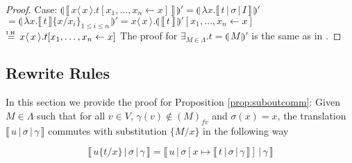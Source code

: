 \documentclass[a4paper,UKenglish,cleveref, autoref]{lipics-v2019}
\newcommand{\fv}[1]{(#1)_{fv}}
\newcommand{\abs}[2]{\lambda #1 . #2}
\newcommand{\fake}[3]{#1 \langle \, #2 \, \rangle . #3}
\newcommand{\share}[3]{#1 [#2 \leftarrow #3]}
\newcommand{\sub}[3]{#1 \{ #2 / #3 \}}
\newcommand{\compile}[1]{\llparenthesis \, #1 \, \rrparenthesis}
\newcommand{\readbackclose}[1]{\llbracket \, #1 \, \rrbracket }
\newcommand{\readbackwmap}[3]{\llbracket \, #1 \, \vert \, #2 \, \vert \, #3  \, \rrbracket }
\newcommand{\IH}{\stackrel{\hbox{\tiny I.H.}}{\hbox{=}}}
\begin{document}
\begin{proof}
\newline
\newline
\indent Case: $\compile{\readbackclose{\fake{x}{x}{t \share{}{x_{1}, \dots, x_{n}}{x}}}}' = \compile{\abs{x}{\readbackwmap{t}{\sigma}{I}}}'$
\newline
\indent $= \compile{\abs{x}{\readbackclose{t} \sub{}{x}{x_{i}}_{1 \leq i \leq n}}}' = \fake{x}{x}{ \compile{\readbackclose{t}}' \share{}{x_{1}, \dots, x_{n}}{x}}$
\newline
\indent $ \IH \fake{x}{x}{ t \share{}{x_{1}, \dots, x_{n}}{x}} $
\newline
\newline
The proof for $\exists_{ M \in \Lambda} . t = \compile{M}'$ is the same as in \cite{gundersen2013atomic}.
\end{proof}

\subsection{Rewrite Rules}

In this section we provide the proof for Proposition \ref{prop:suboutcomm}: Given $M \in \Lambda$ such that for all $v \in V$, $\gamma(v) \not\in \fv{M}$  and $\sigma(x) = x$, the translation $\readbackwmap{u}{\sigma}{\gamma}$ commutes with substitution $\sub{}{M}{x}$ in the following way

$$\readbackwmap{u \sub{}{t}{x}}{\sigma}{\gamma} = \readbackwmap{u}{\sigma[x \mapsto \readbackwmap{t}{\sigma}{\gamma}]}{\gamma}$$

%
\end{document}
